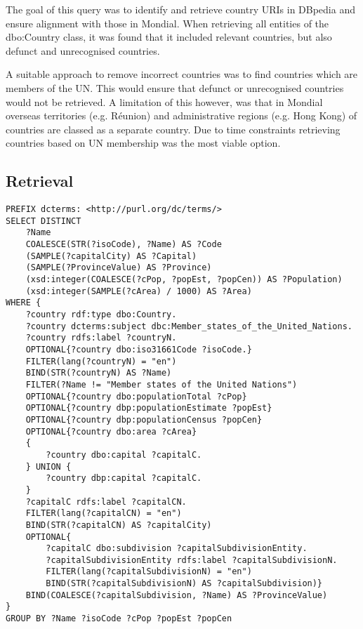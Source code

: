 \documentclass[11pt]{article}
\begin{document}
The goal of this query was to identify and retrieve country URIs in DBpedia and ensure alignment with those in Mondial. When retrieving all entities of the dbo:Country class, it was
found that it included relevant countries, but also defunct and unrecognised countries.

A suitable approach to remove incorrect countries was to find countries which are members of the UN. This would ensure that defunct or unrecognised countries
would not be retrieved. A limitation of this however, was that in Mondial overseas territories (e.g. Réunion) and administrative regions (e.g. Hong Kong) of countries are classed as
a separate country. Due to time constraints retrieving countries based on UN membership was the most viable option.

\subsection{Retrieval}
{\footnotesize\begin{verbatim}
PREFIX dcterms: <http://purl.org/dc/terms/>
SELECT DISTINCT 
    ?Name
    COALESCE(STR(?isoCode), ?Name) AS ?Code
    (SAMPLE(?capitalCity) AS ?Capital)
    (SAMPLE(?ProvinceValue) AS ?Province)
    (xsd:integer(COALESCE(?cPop, ?popEst, ?popCen)) AS ?Population)
    (xsd:integer(SAMPLE(?cArea) / 1000) AS ?Area)
WHERE {
    ?country rdf:type dbo:Country. 
    ?country dcterms:subject dbc:Member_states_of_the_United_Nations. 
    ?country rdfs:label ?countryN.
    OPTIONAL{?country dbo:iso31661Code ?isoCode.}
    FILTER(lang(?countryN) = "en")
    BIND(STR(?countryN) AS ?Name)
    FILTER(?Name != "Member states of the United Nations")
    OPTIONAL{?country dbo:populationTotal ?cPop}
    OPTIONAL{?country dbp:populationEstimate ?popEst}
    OPTIONAL{?country dbp:populationCensus ?popCen}
    OPTIONAL{?country dbo:area ?cArea}
    {
        ?country dbo:capital ?capitalC.
    } UNION {
        ?country dbp:capital ?capitalC.
    }
    ?capitalC rdfs:label ?capitalCN. 
    FILTER(lang(?capitalCN) = "en")
    BIND(STR(?capitalCN) AS ?capitalCity)
    OPTIONAL{ 
        ?capitalC dbo:subdivision ?capitalSubdivisionEntity.
        ?capitalSubdivisionEntity rdfs:label ?capitalSubdivisionN.
        FILTER(lang(?capitalSubdivisionN) = "en")
        BIND(STR(?capitalSubdivisionN) AS ?capitalSubdivision)}
    BIND(COALESCE(?capitalSubdivision, ?Name) AS ?ProvinceValue)
}
GROUP BY ?Name ?isoCode ?cPop ?popEst ?popCen
\end{verbatim}}
\end{document}
